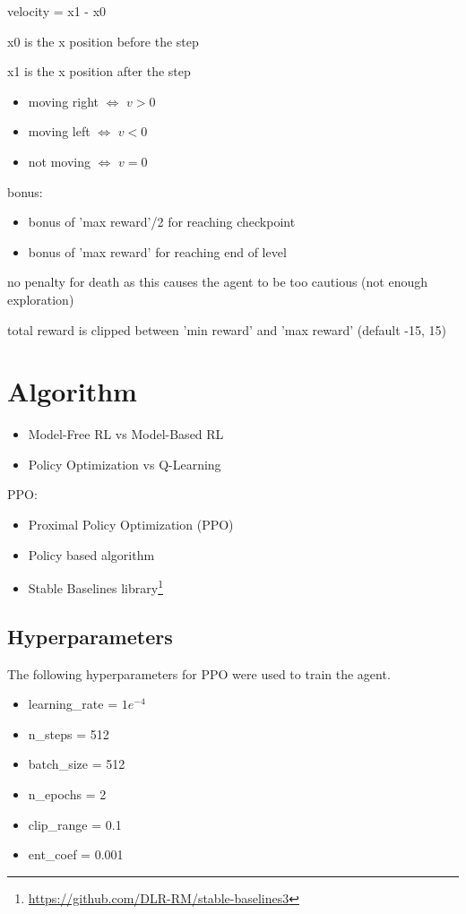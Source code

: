 \documentclass{article}
\begin{document}
    velocity = x1 - x0

    x0 is the x position before the step

    x1 is the x position after the step

    \begin{itemize}
        \item moving right $\Leftrightarrow$ $v > 0$
        \item moving left $\Leftrightarrow$ $v < 0$
        \item not moving $\Leftrightarrow$ $v = 0$
    \end{itemize}
    bonus:
    \begin{itemize}
        \item bonus of 'max reward'/2 for reaching checkpoint
        \item bonus of 'max reward' for reaching end of level
    \end{itemize}
    no penalty for death as this causes the agent to be too cautious (not enough exploration)

    total reward is clipped between 'min reward' and 'max reward' (default -15, 15)

    \section{Algorithm}
    \begin{itemize}
        \item Model-Free RL vs Model-Based RL
        \item Policy Optimization vs Q-Learning
    \end{itemize}
    PPO:
    \begin{itemize}
        \item Proximal Policy Optimization (PPO)\cite{schulman2017proximal}
        \item Policy based algorithm
        \item Stable Baselines library\footnote{\url{https://github.com/DLR-RM/stable-baselines3}}
    \end{itemize}
    \subsection{Hyperparameters}
    The following hyperparameters for PPO were used to train the agent.
    \begin{itemize}
        \item learning\_rate = $1e^{-4}$
        \item n\_steps = 512
        \item batch\_size = 512
        \item n\_epochs = 2
        \item clip\_range = 0.1
        \item ent\_coef = 0.001
    \end{itemize}
\end{document}
